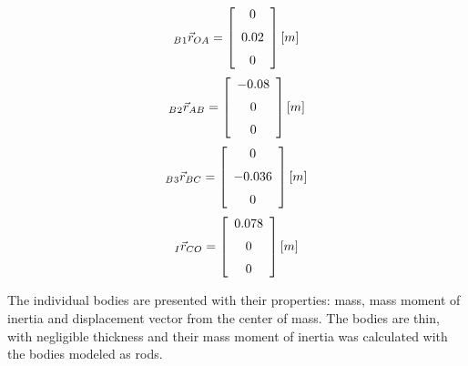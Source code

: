 \begin{equation} \label{disp_vec1}
 _B{_1}\vec{r}_{OA} = \left[ \begin {array}{c} 0\\ \noalign{\medskip} 0.02
\\ \noalign{\medskip}0\end {array} \right ]   [m]
\end{equation}
\begin{equation}\label{disp_vec2}
 _B{_2}\vec{r}_{AB} = \left[ \begin {array}{c} - 0.08\\ \noalign{\medskip}0
\\ \noalign{\medskip}0\end {array} \right] [m]
\end{equation}
\begin{equation}\label{disp_vec3}
_B{_3}\vec{r}_{BC} =  \left[ \begin {array}{c} 0\\ \noalign{\medskip}- 0.036
\\ \noalign{\medskip}0\end {array} \right]  [m]
\end{equation}
\begin{equation}\label{disp_vec4}
_I\vec{r}_{CO} =  \left[ \begin {array}{c}  0.078\\ \noalign{\medskip}0
\\ \noalign{\medskip}0\end {array} \right] [m]
\end{equation}

The individual bodies are presented with their properties: mass, mass moment of inertia and displacement vector from the center of mass. The bodies are thin, with negligible thickness and their mass moment of inertia was calculated with the bodies modeled as rods.

